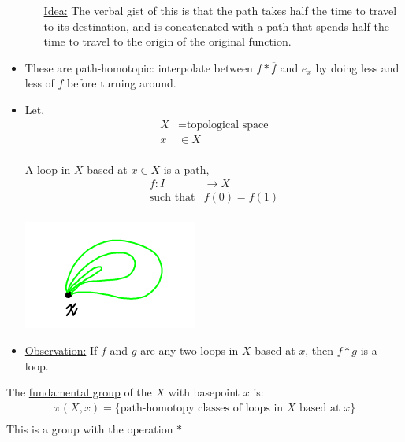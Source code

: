 \documentclass[../notes.tex]{subfiles}
\begin{document}
\begin{itemize}
\begin{enumerate}
\begin{minipage}[c]{\linewidth}
                    \end{minipage}
                    \underline{Idea:} 
                    The verbal gist of this is that the path takes half the time to travel to its destination, and
                    is concatenated with a path that spends half the time to travel to the origin of the original
                    function.\\
            \end{enumerate}
        \item
            These are path-homotopic: interpolate between $f*\overline{f}$ and $e_x$ by doing less and less
            of $f$ before turning around.
        \item Let,
            \begin{align*}
                X&=\text{topological space}\\
                x&\in X\\
            \end{align*}
            \begin{definition} A \underline{loop} in $X$ based at $x\in X$ is a path,
            \begin{align*}
                f:I&\rightarrow X\\
                \text{such that}
                &f(0)=f(1)\\
            \end{align*}
            \end{definition}
            \begin{minipage}[c]{\linewidth}
                \begin{center}
                \includegraphics[]{images/loops.png}
                \end{center}
            \end{minipage}
        \item \underline{Observation:} If $f$ and $g$ are any two loops in $X$ based at $x$,
            then $f*g$ is a loop.
    \end{itemize}
            \begin{definition}
                The \underline{fundamental group} of the $X$ with basepoint $x$ is:
                \begin{align*}
                    \pi(X,x)=\{\text{path-homotopy classes of loops in $X$ based at $x$}\}\\
                \end{align*}
                This is a group with the operation $*$\\
            \end{definition}
\end{document}
